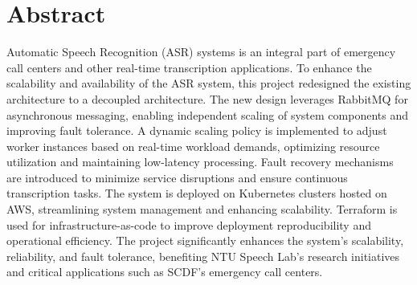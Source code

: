 \chapter*{Abstract}

Automatic Speech Recognition (ASR) systems is an integral part of emergency call centers and other real-time transcription applications. To enhance the scalability and availability of the ASR system, this project redesigned the existing architecture to a decoupled architecture. The new design leverages RabbitMQ for asynchronous messaging, enabling independent scaling of system components and improving fault tolerance. A dynamic scaling policy is implemented to adjust worker instances based on real-time workload demands, optimizing resource utilization and maintaining low-latency processing. Fault recovery mechanisms are introduced to minimize service disruptions and ensure continuous transcription tasks. The system is deployed on Kubernetes clusters hosted on AWS, streamlining system management and enhancing scalability. Terraform is used for infrastructure-as-code to improve deployment reproducibility and operational efficiency. The project significantly enhances the system's scalability, reliability, and fault tolerance, benefiting NTU Speech Lab's research initiatives and critical applications such as SCDF's emergency call centers.
